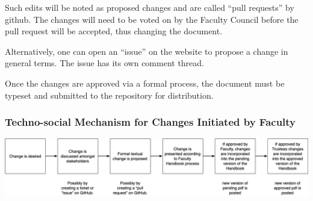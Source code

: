 			Such edits will be noted as proposed changes and are called ``pull requests'' by github.
			The changes will need to be voted on by the Faculty Council before the pull request will be accepted, thus changing the document.

			Alternatively, one can open an ``issue'' on the website to propose a change in general terms.  The issue has its own
			comment thread.

			Once the changes are approved via a formal process, the document must be typeset and submitted to the repository for distribution.
		\subsubsection{Techno-social Mechanism for Changes Initiated by Faculty}
			\begin{center}
				\includegraphics[width=\textwidth]{images/change_process.png}
			\end{center}





